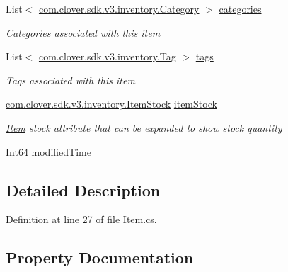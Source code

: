 \begin{DoxyCompactItemize}
\item 
List$<$ \hyperlink{classcom_1_1clover_1_1sdk_1_1v3_1_1inventory_1_1_category}{com.\+clover.\+sdk.\+v3.\+inventory.\+Category} $>$ \hyperlink{classcom_1_1clover_1_1sdk_1_1v3_1_1inventory_1_1_item_ad471a26603e3090feb14480897fc1626}{categories}
\begin{DoxyCompactList}\small\item\em Categories associated with this item \end{DoxyCompactList}\item 
List$<$ \hyperlink{classcom_1_1clover_1_1sdk_1_1v3_1_1inventory_1_1_tag}{com.\+clover.\+sdk.\+v3.\+inventory.\+Tag} $>$ \hyperlink{classcom_1_1clover_1_1sdk_1_1v3_1_1inventory_1_1_item_a5d623c51808818ce0363e8911c68e6dd}{tags}
\begin{DoxyCompactList}\small\item\em Tags associated with this item \end{DoxyCompactList}\item 
\hyperlink{classcom_1_1clover_1_1sdk_1_1v3_1_1inventory_1_1_item_stock}{com.\+clover.\+sdk.\+v3.\+inventory.\+Item\+Stock} \hyperlink{classcom_1_1clover_1_1sdk_1_1v3_1_1inventory_1_1_item_a6edcd5227a75b71a8ae9436595219f6f}{item\+Stock}
\begin{DoxyCompactList}\small\item\em \hyperlink{classcom_1_1clover_1_1sdk_1_1v3_1_1inventory_1_1_item}{Item} stock attribute that can be expanded to show stock quantity \end{DoxyCompactList}\item 
Int64 \hyperlink{classcom_1_1clover_1_1sdk_1_1v3_1_1inventory_1_1_item_a2b74add66faf4233a9d29c5f34b3dd57}{modified\+Time}
\end{DoxyCompactItemize}


\subsection{Detailed Description}


Definition at line 27 of file Item.\+cs.



\subsection{Property Documentation}
\mbox{\label{classcom_1_1clover_1_1sdk_1_1v3_1_1inventory_1_1_item_ac82a6eec76936ce59c611e01a3c112fb}} 
